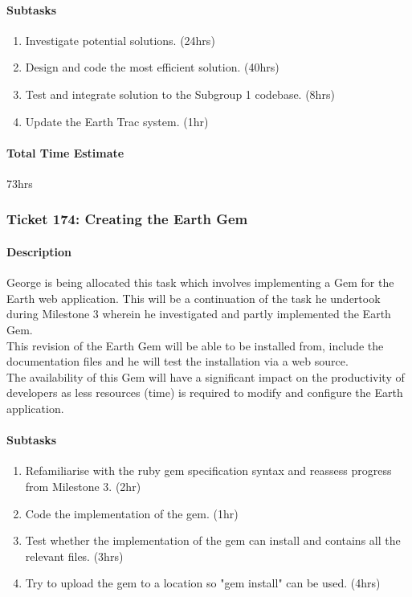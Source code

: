 \documentclass[10pt,a4,oneside]{article}
\begin{document}
\paragraph{Subtasks}
\noindent
\begin{enumerate}
\item Investigate potential solutions. (24hrs) 
\item Design and code the most efficient solution. (40hrs)
\item Test and integrate solution to the Subgroup 1 codebase. (8hrs)
\item Update the Earth Trac system. (1hr)
\end{enumerate}

\paragraph{Total Time Estimate} 73hrs

\subsubsection{Ticket 174: Creating the Earth Gem}

\paragraph{Description}
George is being allocated this task which involves implementing 
a Gem for the Earth web application. This will be a continuation
of the task he undertook during Milestone 3 wherein he investigated 
and partly implemented the Earth Gem.
\\This revision of the Earth Gem will be able to be installed from, include
the documentation files and he will test the installation via a web source.
\\The availability of this 
Gem will have a significant impact on the productivity of developers 
as less resources (time) is required to modify and configure the Earth
application.

\paragraph{Subtasks}
\noindent
\begin{enumerate}
\item Refamiliarise with the ruby gem specification syntax and reassess progress from Milestone 3. (2hr)
\item Code the implementation of the gem. (1hr)
\item Test whether the implementation of the gem can install and contains all the relevant files. (3hrs)
\item Try to upload the gem to a location so "gem install" can be used. (4hrs)
\end{enumerate}
\end{document}
